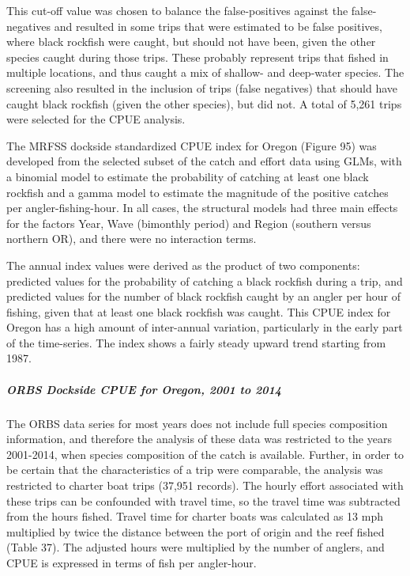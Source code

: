 \documentclass[11pt,
  english,
  letterpaper,
]{article}
\begin{document}
This cut-off value was chosen to balance the false-positives against the false-negatives and resulted in some trips that were estimated to be false positives, where black rockfish were caught, but should not have been, given the other species caught during those trips. These probably represent trips that fished in multiple locations, and thus caught a mix of shallow- and deep-water species. The screening also resulted in the inclusion of trips (false negatives) that should have caught black rockfish (given the other species), but did not. A total of 5,261 trips were selected for the CPUE analysis.

The MRFSS dockside standardized CPUE index for Oregon (Figure 95) was developed from the selected subset of the catch and effort data using GLMs, with a binomial model to estimate the probability of catching at least one black rockfish and a gamma model to estimate the magnitude of the positive catches per angler-fishing-hour. In all cases, the structural models had three main effects for the factors Year, Wave (bimonthly period) and Region (southern versus northern OR), and there were no interaction terms.

The annual index values were derived as the product of two components: predicted values for the probability of catching a black rockfish during a trip, and predicted values for the number of black rockfish caught by an angler per hour of fishing, given that at least one black rockfish was caught. This CPUE index for Oregon has a high amount of inter-annual variation, particularly in the early part of the time-series. The index shows a fairly steady upward trend starting from 1987.

\hypertarget{orbs-dockside-cpue-for-oregon-2001-to-2014}{%
\subparagraph{ORBS Dockside CPUE for Oregon, 2001 to 2014}\label{orbs-dockside-cpue-for-oregon-2001-to-2014}}

The ORBS data series for most years does not include full species composition information, and therefore the analysis of these data was restricted to the years 2001-2014, when species composition of the catch is available. Further, in order to be certain that the characteristics of a trip were comparable, the analysis was restricted to charter boat trips (37,951 records). The hourly effort associated with these trips can be confounded with travel time, so the travel time was subtracted from the hours fished. Travel time for charter boats was calculated as 13 mph multiplied by twice the distance between the port of origin and the reef fished (Table 37). The adjusted hours were multiplied by the number of anglers, and CPUE is expressed in terms of fish per angler-hour.
\end{document}
